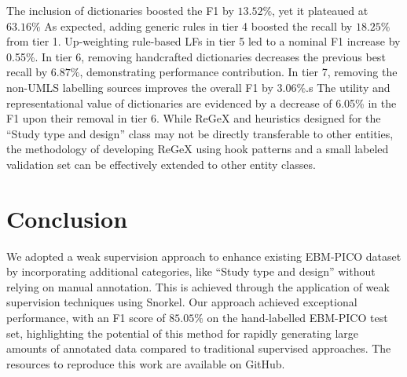 \documentclass{IOS-Book-Article}
\begin{document}
The inclusion of dictionaries boosted the F1 by $13.52\%$, yet it plateaued at $63.16\%$
As expected, adding generic rules in tier 4 boosted the recall by $18.25\%$ from tier 1.
Up-weighting rule-based LFs in tier 5 led to a nominal F1 increase by 0.55\%.
In tier 6, removing handcrafted dictionaries decreases the previous best recall by $6.87\%$, demonstrating performance contribution.
In tier 7, removing the non-UMLS labelling sources improves the overall F1 by $3.06\%$.s%
The utility and representational value of dictionaries are evidenced by a decrease of 6.05\% in the F1 upon their removal in tier 6.
While ReGeX and heuristics designed for the ``Study type and design'' class may not be directly transferable to other entities, the methodology of developing ReGeX using hook patterns and a small labeled validation set can be effectively extended to other entity classes.
%
%
%
%
%
%
%
\section{Conclusion}
\label{sec:conclusion}
%
We adopted a weak supervision approach to enhance existing EBM-PICO dataset by incorporating additional categories, like ``Study type and design'' without relying on manual annotation. 
This is achieved through the application of weak supervision techniques using Snorkel.
Our approach achieved exceptional performance, with an F1 score of $85.05\%$ on the hand-labelled EBM-PICO test set, highlighting the potential of this method for rapidly generating large amounts of annotated data compared to traditional supervised approaches.
The resources to reproduce this work are available on GitHub.
%
%
%
 
%
%

%
\end{document}
